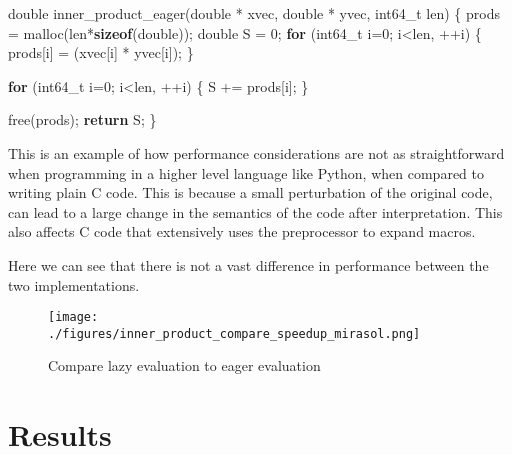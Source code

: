 \documentclass[]{IEEEtran}
\makeatletter
\newenvironment{Shaded}{}{}
\newcommand{\KeywordTok}[1]{\textcolor[rgb]{0.00,0.44,0.13}{\textbf{{#1}}}}
\newcommand{\DataTypeTok}[1]{\textcolor[rgb]{0.56,0.13,0.00}{{#1}}}
\newcommand{\DecValTok}[1]{\textcolor[rgb]{0.25,0.63,0.44}{{#1}}}
\newcommand{\NormalTok}[1]{{#1}}
\def\maxwidth{\ifdim\Gin@nat@width>\linewidth\linewidth
\else\Gin@nat@width\fi}
\let\Oldincludegraphics\includegraphics
\renewcommand{\includegraphics}[1]{\Oldincludegraphics[width=\maxwidth]{#1}}
\makeatother
\begin{document}
\begin{Shaded}
\begin{Highlighting}[numbers=left,,]
\DataTypeTok{double} \NormalTok{inner_product_eager(}\DataTypeTok{double} \NormalTok{* xvec,}
                           \DataTypeTok{double} \NormalTok{* yvec,}
                           \DataTypeTok{int64_t} \NormalTok{len)}
\NormalTok{\{}
    \NormalTok{prods = malloc(len*}\KeywordTok{sizeof}\NormalTok{(}\DataTypeTok{double}\NormalTok{));}
    \DataTypeTok{double} \NormalTok{S = }\DecValTok{0}\NormalTok{;}
    \KeywordTok{for} \NormalTok{(}\DataTypeTok{int64_t} \NormalTok{i=}\DecValTok{0}\NormalTok{; i<len, ++i)}
    \NormalTok{\{}
        \NormalTok{prods[i] = (xvec[i] * yvec[i]);}
    \NormalTok{\}}

    \KeywordTok{for} \NormalTok{(}\DataTypeTok{int64_t} \NormalTok{i=}\DecValTok{0}\NormalTok{; i<len, ++i)}
    \NormalTok{\{}
        \NormalTok{S += prods[i];}
    \NormalTok{\}}

    \NormalTok{free(prods);}
    \KeywordTok{return} \NormalTok{S;}
\NormalTok{\}}
\end{Highlighting}
\end{Shaded}
This is an example of how performance considerations are not as
straightforward when programming in a higher level language like Python,
when compared to writing plain C code. This is because a small
perturbation of the original code, can lead to a large change in the
semantics of the code after interpretation. This also affects C code
that extensively uses the preprocessor to expand macros.

Here we can see that there is not a vast difference in performance
between the two implementations.

\begin{figure}[htbp]
\centering
\texttt{[image: ./figures/inner\_product\_compare\_speedup\_mirasol.png]}
\caption{Compare lazy evaluation to eager evaluation}
\end{figure}

\section{Results}
\end{document}
